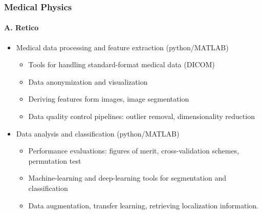\documentclass[9pt]{beamer}
\begin{document}
\begin{frame}
  \frametitle{Medical Physics}
  \framesubtitle{A. Retico}
  \begin{itemize}
  \item Medical data processing and feature extraction (python/MATLAB)%
    \begin{itemize}
    \item Tools for handling standard-format medical data (DICOM)
    \item Data anonymization and visualization
    \item Deriving features form images, image segmentation
    \item Data quality control pipelines: outlier removal, dimensionality
      reduction
    \end{itemize}
  \item Data analysis and classification (python/MATLAB)
    \begin{itemize}
    \item Performance evaluations: figures of merit, cross-validation schemes,
      permutation test
    \item Machine-learning and deep-learning tools for segmentation and
      classification
    \item Data augmentation, transfer learning, retrieving localization
      information.
    \end{itemize}
  \end{itemize}
\end{frame}
\end{document}

